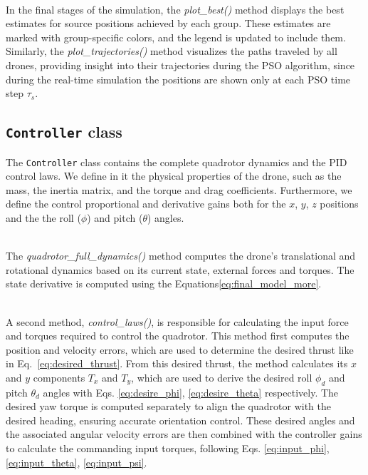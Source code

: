 \noindent\\
In the final stages of the simulation, the \textit{plot\_best()} 
method displays the best estimates for source positions achieved 
by each group. These estimates are marked with group-specific colors, 
and the legend is updated to include them. Similarly, 
the \textit{plot\_trajectories()} method visualizes the paths 
traveled by all drones, providing insight into their trajectories
during the PSO algorithm, since during the real-time simulation
the positions are shown only at each PSO time step $\tau_s$.

\subsection{\texttt{Controller} class}
\label{sec:controller_class}
The \texttt{Controller} class contains the 
complete quadrotor dynamics and the PID control laws. 
We define in it the physical properties of the drone, such as the mass, 
the inertia matrix, and the torque and drag coefficients.
Furthermore, we define the control proportional and derivative 
gains both for the $x$, $y$, $z$ positions and the 
the roll (\(\phi\)) and pitch (\(\theta\)) angles.

\noindent\\
The \textit{quadrotor\_full\_dynamics()} method computes 
the drone's translational and rotational dynamics based on 
its current state, external forces and torques. 
The state derivative is computed using the Equations\ref{eq:final_model_more}.

\noindent\\
A second method, \textit{control\_laws()}, is responsible 
for calculating the input force and torques required 
to control the quadrotor. This method first computes 
the position and velocity errors, which are used to 
determine the desired thrust like in Eq.~\ref{eq:desired_thrust}. 
From this desired thrust, the method calculates its 
$x$ and $y$ components \(T_x\) and \(T_y\), 
which are used to derive the desired roll \(\phi_d\) 
and pitch \(\theta_d\) angles with Eqs. \ref{eq:desire_phi}, 
\ref{eq:desire_theta} respectively. 
The desired yaw torque is computed separately 
to align the quadrotor with the desired heading, 
ensuring accurate orientation control. These desired angles and the 
associated angular velocity errors are then combined 
with the controller gains to calculate the commanding input torques,
following Eqs. \ref{eq:input_phi}, \ref{eq:input_theta}, 
\ref{eq:input_psi}. 

